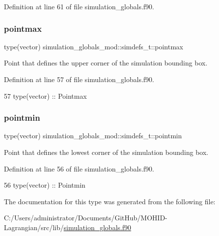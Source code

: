 Definition at line 61 of file simulation\+\_\+globals.\+f90.

\mbox{\label{structsimulation__globals__mod_1_1simdefs__t_a0437ce61f2882028c5e3ca0212aeaf24}} 
\subsubsection{\texorpdfstring{pointmax}{pointmax}}
{\footnotesize\ttfamily type(vector) simulation\+\_\+globals\+\_\+mod\+::simdefs\+\_\+t\+::pointmax\hspace{0.3cm}{\ttfamily [private]}}



Point that defines the upper corner of the simulation bounding box. 



Definition at line 57 of file simulation\+\_\+globals.\+f90.


\begin{DoxyCode}
57         \textcolor{keywordtype}{type}(vector)    ::  Pointmax
\end{DoxyCode}
\mbox{\label{structsimulation__globals__mod_1_1simdefs__t_af3a5fb325c955840515f199c8be30aa7}} 
\subsubsection{\texorpdfstring{pointmin}{pointmin}}
{\footnotesize\ttfamily type(vector) simulation\+\_\+globals\+\_\+mod\+::simdefs\+\_\+t\+::pointmin\hspace{0.3cm}{\ttfamily [private]}}



Point that defines the lowest corner of the simulation bounding box. 



Definition at line 56 of file simulation\+\_\+globals.\+f90.


\begin{DoxyCode}
56         \textcolor{keywordtype}{type}(vector)    ::  Pointmin
\end{DoxyCode}


The documentation for this type was generated from the following file\+:\begin{DoxyCompactItemize}
\item 
C\+:/\+Users/administrator/\+Documents/\+Git\+Hub/\+M\+O\+H\+I\+D-\/\+Lagrangian/src/lib/\mbox{\hyperlink{simulation__globals_8f90}{simulation\+\_\+globals.\+f90}}\end{DoxyCompactItemize}
